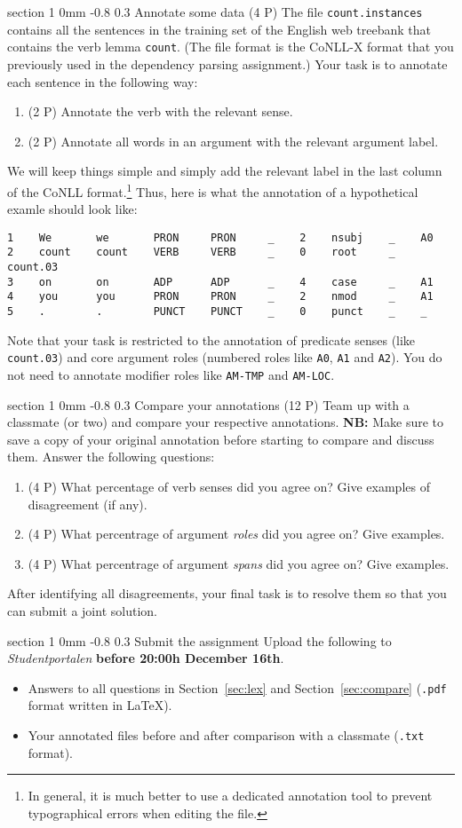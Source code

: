 \documentclass[11pt]{article}
\makeatletter
\newcommand{\newsec}[2]{\section{#1}\label{sec:#2}\noindent}
\renewcommand{\section}{\@startsection
{section}%
{1}%
{0mm}%
{-0.8\baselineskip}%
{0.3\baselineskip}%
{\bfseries\large}}%
\makeatother
\begin{document}
\newsec{Annotate some data (4 P)}{annotate}%
The file {\tt count.instances} contains all the sentences in the
training set of the English web treebank that contains the verb lemma
{\tt count}. (The file format is the CoNLL-X format that you
previously used in the dependency parsing assignment.) Your task is to
annotate each sentence in the following way:
\begin{enumerate}[noitemsep,topsep=0.2cm]
\item (2 P) Annotate the verb with the relevant sense.
\item (2 P) Annotate all words in an argument with the relevant argument label.
\end{enumerate}
We will keep things simple and simply add the relevant label in the
last column of the CoNLL format.\footnote{In general, it is much
  better to use a dedicated annotation tool to prevent typographical
  errors when editing the file.}  Thus, here is what the annotation of
a hypothetical examle should look like:
\begin{Verbatim}[fontsize=\small,xleftmargin=\parindent]
1    We       we       PRON     PRON     _    2    nsubj    _    A0
2    count    count    VERB     VERB     _    0    root     _    count.03
3    on       on       ADP      ADP      _    4    case     _    A1
4    you      you      PRON     PRON     _    2    nmod     _    A1
5    .        .        PUNCT    PUNCT    _    0    punct    _    _
\end{Verbatim}
Note that your task is restricted to the annotation of predicate
senses (like {\tt count.03}) and core argument roles (numbered roles
like {\tt A0}, {\tt A1} and {\tt A2}). You do not need to annotate
modifier roles like {\tt AM-TMP} and {\tt AM-LOC}.

\newsec{Compare your annotations (12 P)}{compare}%
Team up with a classmate (or two) and compare your respective
annotations. {\bf NB:} Make sure to save a copy of your original
annotation before starting to compare and discuss them.  Answer the
following questions:
\begin{enumerate}[noitemsep,topsep=0.2cm]
\item (4 P) What percentage of verb senses did you agree on? Give
  examples of disagreement (if any).
\item (4 P) What percentrage of argument {\em roles} did you agree on?
  Give examples.
\item (4 P) What percentrage of argument {\em spans} did you agree on?
  Give examples.
\end{enumerate}
After identifying all disagreements, your final task is to resolve
them so that you can submit a joint solution.

\newsec{Submit the assignment}{submit}%
Upload the following to {\it Studentportalen}
\textbf{before 20:00h December 16th}.
\begin{itemize}[noitemsep,topsep=0.2cm]
\item Answers to all questions in Section~\ref{sec:lex} and
  Section~\ref{sec:compare} (\texttt{.pdf} format written in \LaTeX).
\item Your annotated files before and after comparison with a
  classmate (\texttt{.txt} format).
\end{itemize}
\end{document}
